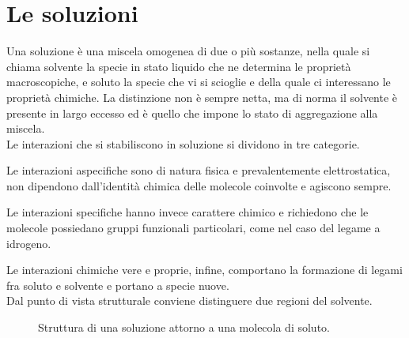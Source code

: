 \chapter{Le soluzioni}

Una soluzione è una miscela omogenea di due o più sostanze, nella quale si chiama solvente la specie in stato liquido che ne determina le proprietà macroscopiche, e soluto la specie che vi si scioglie e della quale ci interessano le proprietà chimiche.
La distinzione non è sempre netta, ma di norma il solvente è presente in largo eccesso ed è quello che impone lo stato di aggregazione alla miscela.\\

Le interazioni che si stabiliscono in soluzione si dividono in tre categorie.

Le interazioni aspecifiche sono di natura fisica e prevalentemente elettrostatica, non dipendono dall'identità chimica delle molecole coinvolte e agiscono sempre.

Le interazioni specifiche hanno invece carattere chimico e richiedono che le molecole possiedano gruppi funzionali particolari, come nel caso del legame a idrogeno.

Le interazioni chimiche vere e proprie, infine, comportano la formazione di legami fra soluto e solvente e portano a specie nuove.\\

Dal punto di vista strutturale conviene distinguere due regioni del solvente.

\begin{figure}[htbp]
    \centering
    \caption{Struttura di una soluzione attorno a una molecola di soluto.}
\end{figure}



